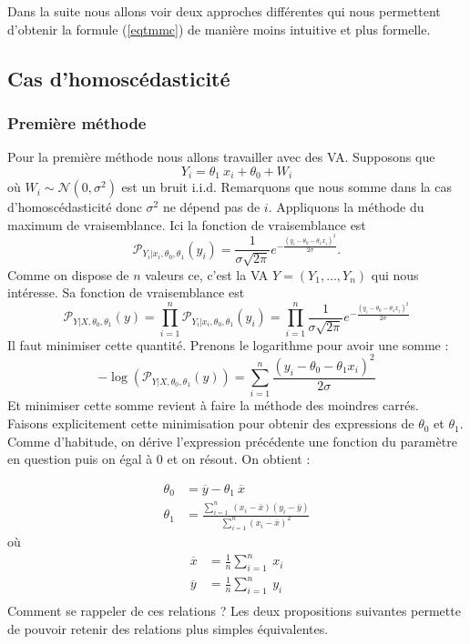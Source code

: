 \documentclass[a4paper,12pt]{report}
\theoremstyle{definition}
\renewcommand{\(}{\left(}
\renewcommand{\)}{\right)}
\renewcommand{\P}{\mathcal{P}}
\renewcommand{\bar}{\overline}
\begin{document}
        Dans la suite nous allons voir deux approches différentes qui nous permettent d'obtenir la formule (\ref{eqtmmc}) de manière moins intuitive et plus formelle.\\
        
        \subsection{Cas d'homoscédasticité}
            
            \subsubsection{Première méthode}
            
            Pour la première méthode nous allons travailler avec des VA. Supposons que 
            $$Y_i = \theta_1~x_i+\theta_0+W_i$$
            où $W_i\sim\mathcal{N}(0,\sigma^2)$ est un bruit i.i.d. Remarquons que nous somme dans la cas d'homoscédasticité donc $\sigma^2$ ne dépend pas de $i$. Appliquons la méthode du maximum de vraisemblance. Ici la fonction de vraisemblance est
            $$\P_{Y_i|x_i,\theta_0,\theta_1}(y_i) = \frac{1}{\sigma\sqrt{2\pi}}e^{-\frac{(y_i-\theta_0-\theta_1x_i)^2}{2\sigma}}.$$
            Comme on dispose de $n$ valeurs ce, c'est la VA $Y=(Y_1,\dots,Y_n)$ qui nous intéresse. Sa fonction de vraisemblance est
            $$\P_{Y|X,\theta_0,\theta_1}(y) = \prod_{i=1}^{n} \P_{Y_i|x_i,\theta_0,\theta_1}(y_i) = \prod_{i=1}^{n}\frac{1}{\sigma\sqrt{2\pi}}e^{-\frac{(y_i-\theta_0-\theta_1x_i)^2}{2\sigma}}$$
            Il faut minimiser cette quantité. Prenons le logarithme pour avoir une somme :
            $$-\log\left( \P_{Y|X,\theta_0,\theta_1}(y) \right) = \sum_{i=1}^n \frac{(y_i-\theta_0-\theta_1x_i)^2}{2\sigma}$$
            Et minimiser cette somme revient à faire la méthode des moindres carrés.\\
            Faisons explicitement cette minimisation pour obtenir des expressions de $\theta_0$ et $\theta_1$. Comme d'habitude, on dérive l'expression précédente une fonction du paramètre en question puis on égal à 0 et on résout. On obtient :
            
            \begin{align*}
                \theta_0 &= \bar{y}-\theta_1~\bar{x} \\
                \theta_1 &= \frac{\sum_{i=1}^n~(x_i-\bar{x})(y_i-\bar{y})}{\sum_{i=1}^n(x_i-\bar{x})^2}
            \end{align*}
            où
            \begin{align*}
                \bar{x} &= \frac{1}{n}\sum_{i=1}^n~x_i\\
                \bar{y} &= \frac{1}{n}\sum_{i=1}^n~y_i\\
            \end{align*}
            Comment se rappeler de ces relations ? Les deux propositions suivantes permette de pouvoir retenir des relations plus simples équivalentes.
            
\end{document}
